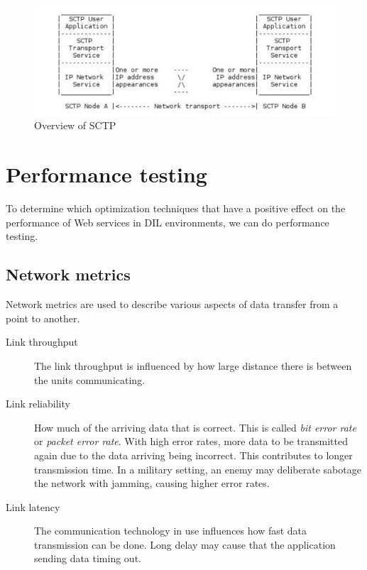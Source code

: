 \begin{figure}[h]
\includegraphics[scale=0.5]{images/sctp.pdf}
\caption{Overview of SCTP}
\end{figure}

\section{Performance testing}

To determine which optimization techniques that have a positive effect on the
performance of Web services in DIL environments, we can do performance testing.

\subsection{Network metrics}

Network metrics are used to describe various aspects of data transfer from a
point to another.

\begin{description}

\item[Link throughput] The link throughput is influenced by how large distance
there is between the units communicating.

\item[Link reliability] How much of the arriving data that is correct. This is
called \textit{bit error rate} or \textit{packet error rate}. With high error
rates, more data to be transmitted again due to the data arriving being
incorrect. This contributes to longer transmission time. In a military setting,
an enemy may deliberate sabotage the network with jamming, causing higher error
rates.

\item[Link latency] The communication technology in use influences how fast data
transmission can be done. Long delay may cause that the application sending data
timing out.

\end{description}

